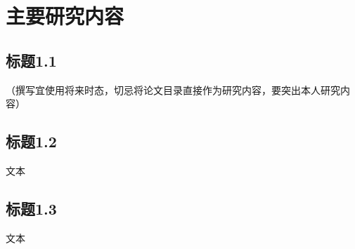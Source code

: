 \section{主要研究内容}
\subsection{标题1.1}
（撰写宜使用将来时态，切忌将论文目录直接作为研究内容，要突出本人研究内容）

\subsection{标题1.2}
文本

\subsection{标题1.3}
文本